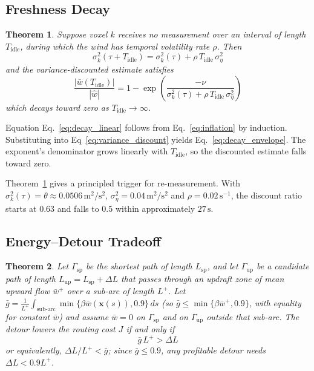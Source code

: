 \documentclass[conference]{IEEEtran}
\newcommand{\rd}[1]{#1}   %
\newcommand{\rdisp}{}     %
\newcommand{\Tid}{T_{\mathrm{idle}}}
\newtheorem{theorem}{Theorem}
\begin{document}
\subsection{Freshness Decay}

\begin{theorem}
\label{thm:decay}
Suppose voxel $k$ receives no measurement over an
interval of length $\Tid$, during which the wind has temporal
volatility rate $\rho$. Then
\begin{equation}
\sigma_k^{2}(\tau+\Tid) =
\sigma_k^{2}(\tau) + \rho\,\Tid\,\sigma_\eta^2
\label{eq:decay_linear}
\end{equation}
and the variance-discounted estimate satisfies
\begin{equation}
\frac{\bigl|\bar{w}(\Tid)\bigr|}{|\hat{w}|}
= 1 - \exp\!\left(
\frac{-\nu}{\sigma_k^{2}(\tau)+\rho\,\Tid\,\sigma_\eta^2}\right)
\label{eq:decay_envelope}
\end{equation}
which decays toward zero as $\Tid\to\infty$.
\end{theorem}

\begin{IEEEproof}
Equation Eq.~\eqref{eq:decay_linear} follows from Eq.~\eqref{eq:inflation} by
induction. Substituting into Eq~\eqref{eq:variance_discount}
yields Eq.~\eqref{eq:decay_envelope}. The exponent's
denominator grows linearly with $\Tid$, so the discounted estimate falls toward zero.
\end{IEEEproof}

Theorem~\ref{thm:decay} gives a
principled trigger for re-measurement. With \rd{$\sigma_k^2(\tau)=\theta\approx0.0506\,\mathrm{m^2/s^2}$,} $\sigma_\eta^2=0.04\,\mathrm{m^2/s^2}$
and $\rho=0.02$\rd{$\,\mathrm{s^{-1}}$}, the discount \rd{ratio starts at $0.63$ and} falls to \rd{$0.5$} within approximately
\rd{$27\,\mathrm{s}$}.

\subsection{Energy--Detour Tradeoff}

\begin{theorem}
\label{thm:detour}
Let $\Gamma_\mathrm{sp}$ be the shortest path of length $L_\mathrm{sp}$, and
let $\Gamma_\mathrm{up}$ be a candidate path of length $L_\mathrm{up}=L_\mathrm{sp}+\Delta L$ that
passes through an updraft zone of mean upward flow $\bar{w}^+$ over
a sub-arc of length $L^+$\rd{. Let $\bar g=\frac{1}{L^+}\int_{\text{sub-arc}}\min\{\beta\bar{w}(\mathbf{x}(s)),0.9\}\,ds$ (so $\bar g\le\min\{\beta\bar{w}^+,0.9\}$, with equality for constant $\bar w$) and assume $\bar{w}=0$ on $\Gamma_\mathrm{sp}$ and on
$\Gamma_\mathrm{up}$ outside that sub-arc}. The detour \rd{lowers the routing cost $J$} if and
only if
\begin{equation}
\rdisp\bar g\,L^+ > \Delta L
\label{eq:detour_condition}
\end{equation}
or equivalently, $\Delta L/L^+ < \rd{\bar g}$\rd{; since $\bar g\le0.9$, any profitable detour needs $\Delta L<0.9L^+$}.
\end{theorem}
\end{document}
